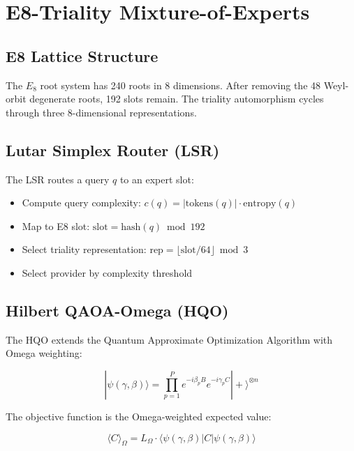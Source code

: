 \documentclass[11pt]{article}
\theoremstyle{plain}
\begin{document}
\section{E8-Triality Mixture-of-Experts}

\subsection{E8 Lattice Structure}

The \( E_8 \) root system has 240 roots in 8 dimensions. After removing the 48 Weyl-orbit degenerate roots, 192 slots remain. The triality automorphism cycles through three 8-dimensional representations.

\subsection{Lutar Simplex Router (LSR)}

The LSR routes a query \( q \) to an expert slot:

\begin{itemize}
  \item Compute query complexity: \( c(q) = |\text{tokens}(q)| \cdot \text{entropy}(q) \)
  \item Map to E8 slot: \( \text{slot} = \text{hash}(q) \bmod 192 \)
  \item Select triality representation: \( \text{rep} = \lfloor \text{slot} / 64 \rfloor \bmod 3 \)
  \item Select provider by complexity threshold
\end{itemize}

\subsection{Hilbert QAOA-Omega (HQO)}

The HQO extends the Quantum Approximate Optimization Algorithm with Omega weighting:

\begin{equation}
|\psi(\gamma, \beta)\rangle = \prod_{p=1}^{P} e^{-i\beta_p B} e^{-i\gamma_p C} |+\rangle^{\otimes n}
\end{equation}

The objective function is the Omega-weighted expected value:

\begin{equation}
\langle C \rangle_\Omega = L_\Omega \cdot \langle \psi(\gamma, \beta) | C | \psi(\gamma, \beta) \rangle
\end{equation}
\end{document}
